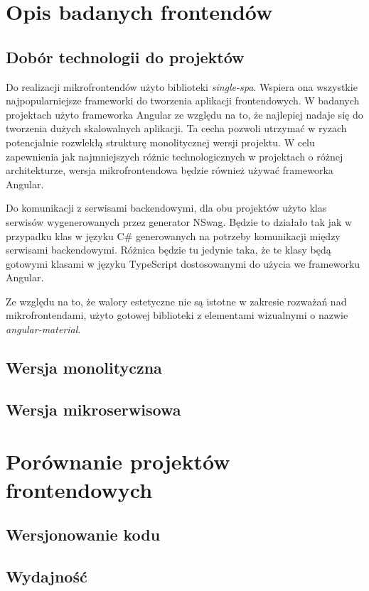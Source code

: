 \documentclass{SGGW-thesis}
\begin{document}
\chapter{Opis badanych frontendów}
  \section{Dobór technologii do projektów}
  Do realizacji mikrofrontendów użyto biblioteki \textit{single-spa}. Wspiera ona wszystkie najpopularniejsze frameworki do tworzenia aplikacji frontendowych. W badanych projektach użyto frameworka Angular ze względu na to, że najlepiej nadaje się do tworzenia dużych skalowalnych aplikacji. Ta cecha pozwoli utrzymać w ryzach potencjalnie rozwlekłą strukturę monolitycznej wersji projektu. W celu zapewnienia jak najmniejszych różnic technologicznych w projektach o różnej architekturze, wersja mikrofrontendowa będzie również używać frameworka Angular.

  Do komunikacji z serwisami backendowymi, dla obu projektów użyto klas serwisów wygenerowanych przez generator NSwag. Będzie to działało tak jak w przypadku klas w języku C\# generowanych na potrzeby komunikacji między serwisami backendowymi. Różnica będzie tu jedynie taka, że te klasy będą gotowymi klasami w języku TypeScript dostosowanymi do użycia we frameworku Angular.

  Ze względu na to, że walory estetyczne nie są istotne w zakresie rozważań nad mikrofrontendami, użyto gotowej biblioteki z elementami wizualnymi o nazwie \textit{angular-material}. 

  \section{Wersja monolityczna}
  \section{Wersja mikroserwisowa}

\chapter{Porównanie projektów frontendowych}
  \section{Wersjonowanie kodu}
  \section{Wydajność}
\end{document}
